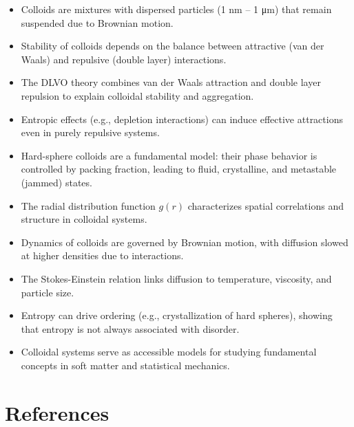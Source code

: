 \documentclass[
  letterpaper,
  enabledeprecatedfontcommands]{report}
\providecommand{\tightlist}{%
  \setlength{\itemsep}{0pt}\setlength{\parskip}{0pt}}
\begin{document}
\begin{tcolorbox}[enhanced jigsaw, toprule=.15mm, opacityback=0, colbacktitle=quarto-callout-important-color!10!white, title=\textcolor{quarto-callout-important-color}{\faExclamation}\hspace{0.5em}{Check your understanding}, leftrule=.75mm, rightrule=.15mm, bottomtitle=1mm, breakable, colframe=quarto-callout-important-color-frame, colback=white, toptitle=1mm, left=2mm, titlerule=0mm, coltitle=black, arc=.35mm, bottomrule=.15mm, opacitybacktitle=0.6]

\begin{itemize}
\tightlist
\item
  Colloids are mixtures with dispersed particles (1 nm -- 1 μm) that
  remain suspended due to Brownian motion.
\item
  Stability of colloids depends on the balance between attractive (van
  der Waals) and repulsive (double layer) interactions.
\item
  The DLVO theory combines van der Waals attraction and double layer
  repulsion to explain colloidal stability and aggregation.
\item
  Entropic effects (e.g., depletion interactions) can induce effective
  attractions even in purely repulsive systems.
\item
  Hard-sphere colloids are a fundamental model: their phase behavior is
  controlled by packing fraction, leading to fluid, crystalline, and
  metastable (jammed) states.
\item
  The radial distribution function \(g(r)\) characterizes spatial
  correlations and structure in colloidal systems.
\item
  Dynamics of colloids are governed by Brownian motion, with diffusion
  slowed at higher densities due to interactions.
\item
  The Stokes-Einstein relation links diffusion to temperature,
  viscosity, and particle size.
\item
  Entropy can drive ordering (e.g., crystallization of hard spheres),
  showing that entropy is not always associated with disorder.
\item
  Colloidal systems serve as accessible models for studying fundamental
  concepts in soft matter and statistical mechanics.
\end{itemize}

\end{tcolorbox}

\section*{References}\label{references}
\end{document}
